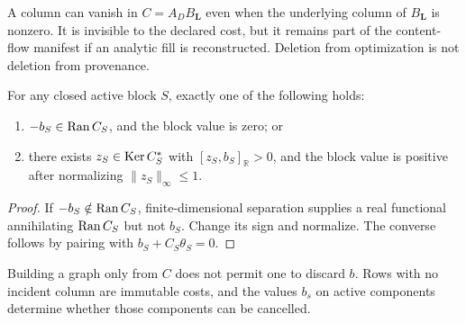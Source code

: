 \begin{remark}
A column can vanish in \(C=A_DB_{\boldsymbol L}\) even when the
underlying column of \(B_{\boldsymbol L}\) is nonzero. It is invisible
to the declared cost, but it remains part of the content-flow manifest
if an analytic fill is reconstructed. Deletion from optimization is not
deletion from provenance.
\end{remark}

\begin{corollary}
\label{cor:zero-cost-alternative}
For any closed active block \(S\), exactly one of the following holds:
\begin{enumerate}[label=\textup{(\roman*)},leftmargin=2.7em]
 \item \(-b_S\in\operatorname{Ran} C_S\), and the block value is zero; or
 \item there exists \(z_S\in\operatorname{Ker} C_S^*\) with
       \([z_S,b_S]_{\mathbb R}>0\), and the block value is positive after
       normalizing \(\|z_S\|_\infty\le1\).
\end{enumerate}
\end{corollary}

\begin{proof}
If \(-b_S\notin\operatorname{Ran} C_S\), finite-dimensional separation supplies a
real functional annihilating \(\operatorname{Ran} C_S\) but not \(b_S\). Change its
sign and normalize. The converse follows by pairing with
\(b_S+C_S\theta_S=0\).
\end{proof}

\begin{remark}
Building a graph only from \(C\) does not permit one to discard \(b\).
Rows with no incident column are immutable costs, and the values
\(b_s\) on active components determine whether those components can be
cancelled.
\end{remark}
